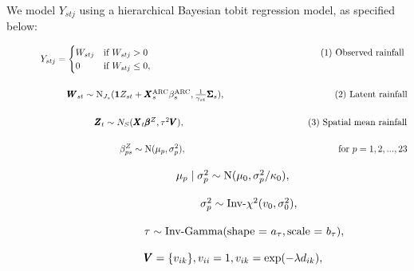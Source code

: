 \documentclass[11pt]{article}
\def\bbeta{\pmb{\beta}}
\def\bSigma{\pmb{\Sigma}}
\def\bX{\pmb{X}}
\def\bZ{\pmb{Z}}
\def\bV{\pmb{V}}
\def\bW{\pmb{W}}
\begin{document}
We model $Y_{stj}$ using a hierarchical Bayesian tobit regression model, as specified below:

\newpage

$\hspace{0.5in}
Y_{stj} = \begin{cases} W_{stj} &\mbox{if } W_{stj} > 0 \hspace{2.6in} \text{(1) Observed rainfall}\\
0  &\mbox{if } W_{stj} \leq 0, \end{cases}\\
$

$\hspace{0.9in}
\bW_{st} \sim \text{N}_{J_s}(\mathbf{1}Z_{st} + \bX^\text{ARC}_s \beta^\text{ARC}_s, \frac{1}{\gamma_{st}}\bSigma_s), \hspace{1.65in} \text{(2) Latent rainfall}
$

$\hspace{1.3in}
\bZ_t \sim N_S(\bX_t \bbeta^Z, \tau^2\bV), \hspace{1.85in} \text{(3) Spatial mean rainfall}
$

$\hspace{1.7in}
\beta_{ps}^Z \sim \text{N}(\mu_p, \sigma^2_p), \hspace{2.3in} \text{for } p = 1, 2, ..., 23
$

$\hspace{2.1in}
\mu_{p} \mid \sigma_p^2 \sim \text{N}(\mu_0, \sigma_p^2/\kappa_0),
$

$\hspace{2.4in}
\sigma_{p}^2 \sim \text{Inv-}\chi^2(v_0, \sigma_0^2),
$

$\hspace{1.7in}
\tau \sim \text{Inv-Gamma}(\text{shape = } a_\tau, \text{scale = } b_\tau),
$

$\hspace{1.7in}
\bV=\{v_{ik}\}, v_{ii}=1, v_{ik} = \exp(-\lambda d_{ik}),%
$
\end{document}
